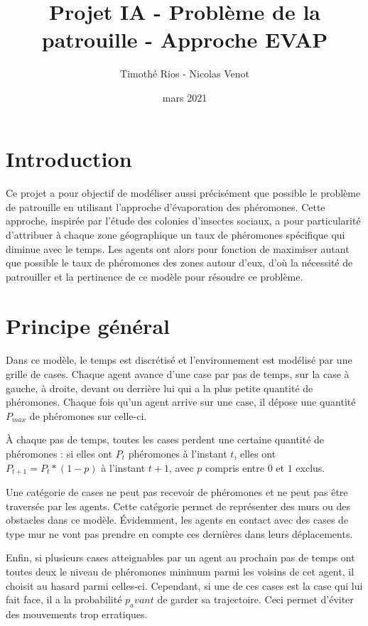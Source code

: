 \documentclass{article}
\title{Projet IA - Problème de la patrouille - Approche EVAP}
\author{Timothé Rios - Nicolas Venot}
\date{mars 2021}
\begin{document}
\maketitle
\newpage
\tableofcontents
\newpage
\setlength{\parindent}{0pt}
\section*{Introduction}
\paragraph{}Ce projet a pour objectif de modéliser aussi précisément que possible le problème de patrouille 
en utilisant l'approche d'évaporation des phéromones.
Cette approche, inspirée par l'étude des colonies d'insectes sociaux, a pour 
particularité d'attribuer à chaque zone géographique un taux de phéromones spécifique qui diminue avec le temps.
Les agents ont alors pour fonction de maximiser autant que possible le taux de phéromones 
des zones autour d'eux, d'où la nécessité de patrouiller et la pertinence de ce modèle pour 
résoudre ce problème.

\section{Principe général}

\paragraph{} Dans ce modèle, le temps est discrétisé et l'environnement est modélisé par une grille de cases. Chaque agent
avance d'une case par pas de temps, sur la case à gauche, à droite, devant ou derrière lui qui a la plus petite quantité de phéromones. Chaque fois qu'un agent arrive sur
une case, il dépose une quantité $P_{max}$ de phéromones sur celle-ci. 

À chaque pas de temps, toutes les cases perdent une certaine quantité de phéromones : si elles ont $P_t$ phéromones
à l'instant $t$, elles ont $P_{t+1} = P_t * (1-p)$ à l'instant $t+1$, avec $p$ compris entre $0$ et $1$ exclus.

Une catégorie de cases ne peut pas recevoir de phéromones et ne peut pas être traversée par les agents. Cette catégorie permet
de représenter des murs ou des obstacles dans ce modèle. Évidemment, les agents en contact avec des cases de type mur
ne vont pas prendre en compte ces dernières dans leurs déplacements.

Enfin, si plusieurs cases atteignables par un agent au prochain pas de temps ont toutes deux le niveau de phéromones minimum 
parmi les voisins de cet agent, il choisit au hasard parmi celles-ci. Cependant, si une de ces cases est la case qui lui fait 
face, il a la probabilité $p_avant$ de garder sa trajectoire. Ceci permet d'éviter des mouvements trop erratiques.
\end{document}
